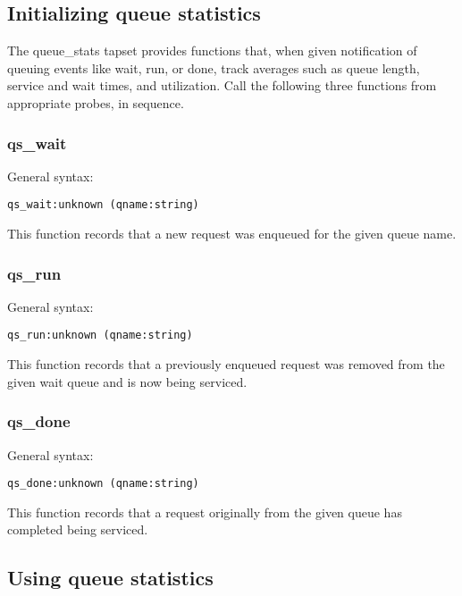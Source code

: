 \documentclass[twoside,english]{article}
\newenvironment{vindent}
{\begin{list}{}{\setlength{\listparindent}{6pt}}
\item[]}
{\end{list}}
\begin{document}
\subsection{Initializing queue statistics}
The queue\_stats tapset provides functions that, when given notification
of queuing events like wait, run, or done, track averages such as queue length,
service and wait times, and utilization. Call the following three functions
from appropriate probes, in sequence.


\subsubsection{qs\_wait}
General syntax:

\begin{vindent}
\begin{verbatim}
qs_wait:unknown (qname:string)
\end{verbatim}
\end{vindent}
This function records that a new request was enqueued for the given queue
name.


\subsubsection{qs\_run}
General syntax:

\begin{vindent}
\begin{verbatim}
qs_run:unknown (qname:string)
\end{verbatim}
\end{vindent}
This function records that a previously enqueued request was removed from
the given wait queue and is now being serviced.


\subsubsection{qs\_done}
General syntax:

\begin{vindent}
\begin{verbatim}
qs_done:unknown (qname:string)
\end{verbatim}
\end{vindent}
This function records that a request originally from the given queue has
completed being serviced.


\subsection{Using queue statistics}
\end{document}

